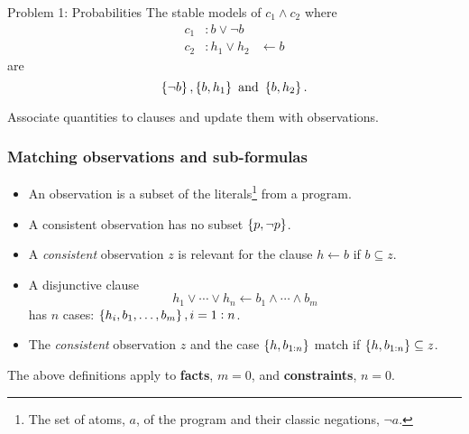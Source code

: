 \documentclass[bigger]{beamer}
\begin{document}
    \begin{frame}{Problem 1: Probabilities}
        The stable models of $c_1 \wedge c_2$ where
        $$        
        \begin{aligned}
            c_1 &: b \vee \neg b\\
            c_2 &: h_1 \vee h_2 &\leftarrow b
        \end{aligned}
        $$
        are $$\set{\neg b}, \set{b, h_1}~\text{and}~\set{b, h_2}.$$  

        \begin{block}{Associate quantities to clauses and update them with observations.}        
        \end{block}    
    \end{frame}

    \begin{frame}
        \frametitle{Matching observations and sub-formulas}

        \begin{itemize}
            \item An \alert{observation} is a subset of the literals\footnote{The set of atoms, $a$, of the program and their classic negations, $\neg a$.} from a program.
            \item A \alert{consistent} observation has no subset $\set{p, \neg p}$.
            \item A \emph{consistent} observation $z$ is \alert{relevant} for the clause $h \leftarrow b$ if $b \subseteq z$.
            \item A disjunctive clause $$h_1 \vee \cdots \vee h_n \leftarrow b_1 \wedge \cdots \wedge b_m$$ has $n$ \alert{cases}: $\set{h_i, b_1, \ldots, b_m}, i = 1:n$.
            \item The \emph{consistent} observation $z$ and the case $\set{h, b_{1:n}}$  \alert{match} if 
            $\set{h, b_{1:n}} \subseteq z$.     
        \end{itemize}
        The above definitions apply to \textbf{facts}, $m=0$, and \textbf{constraints}, $n=0$.
    \end{frame}
\end{document}
